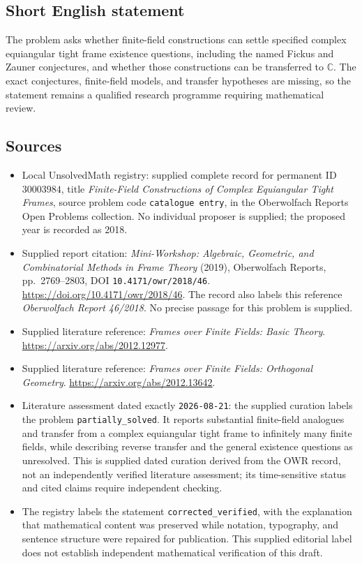 \documentclass[11pt]{article}
\newcommand{\C}{\mathbb{C}}
\begin{document}
\subsection{Short English statement}
The problem asks whether finite-field constructions can settle specified complex equiangular tight frame existence questions, including the named Fickus and Zauner conjectures, and whether those constructions can be transferred to \(\C\). The exact conjectures, finite-field models, and transfer hypotheses are missing, so the statement remains a qualified research programme requiring mathematical review.
\subsection{Sources}
\begin{itemize}
\item Local UnsolvedMath registry: supplied complete record for permanent ID \(30003984\), title \emph{Finite-Field Constructions of Complex Equiangular Tight Frames}, source problem code \texttt{catalogue entry}, in the Oberwolfach Reports Open Problems collection. No individual proposer is supplied; the proposed year is recorded as 2018.
\item Supplied report citation: \emph{Mini-Workshop: Algebraic, Geometric, and Combinatorial Methods in Frame Theory} (2019), Oberwolfach Reports, pp.\ 2769--2803, DOI \texttt{10.4171/owr/2018/46}. \url{https://doi.org/10.4171/owr/2018/46}. The record also labels this reference \emph{Oberwolfach Report 46/2018}. No precise passage for this problem is supplied.
\item Supplied literature reference: \emph{Frames over Finite Fields: Basic Theory}. \url{https://arxiv.org/abs/2012.12977}.
\item Supplied literature reference: \emph{Frames over Finite Fields: Orthogonal Geometry}. \url{https://arxiv.org/abs/2012.13642}.
\item Literature assessment dated exactly \texttt{2026-08-21}: the supplied curation labels the problem \texttt{partially\_solved}. It reports substantial finite-field analogues and transfer from a complex equiangular tight frame to infinitely many finite fields, while describing reverse transfer and the general existence questions as unresolved. This is supplied dated curation derived from the OWR record, not an independently verified literature assessment; its time-sensitive status and cited claims require independent checking.
\item The registry labels the statement \texttt{corrected\_verified}, with the explanation that mathematical content was preserved while notation, typography, and sentence structure were repaired for publication. This supplied editorial label does not establish independent mathematical verification of this draft.
\end{itemize}
\end{document}
